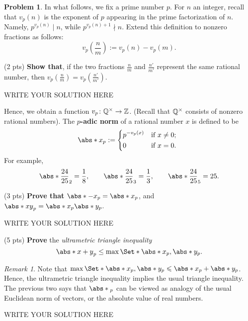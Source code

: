 \documentclass[11pt]{article}
\theoremstyle{plain}
\theoremstyle{definition}
\newtheorem{problem}{Problem}
\theoremstyle{remark}
\newtheorem*{remark}{Remark}
\numberwithin{equation}{problem}
\begin{document}
\begin{problem}
	In what follows, we fix a prime number $p$.
	For $n$ an integer, recall that $v_p(n)$ is the exponent of $p$ appearing in the prime factorization of $n$. Namely, $p^{v_p(n)}\mid n$, while $p^{v_p(n)+1}\nmid n$. Extend this definition to nonzero fractions as follows:
	\[
		v_p(\frac{n}{m}) := v_p(n) - v_p(m).
	\]
	\begin{listinprob}
		\item (2 pts) \textbf{Show that}, if the two fractions $\frac{n}{m}$ and $\frac{n'}{m'}$ represent the same rational number, then $v_p(\frac{n}{m})=v_p(\frac{n'}{m'})$.
	\end{listinprob}
\begin{solution} %
WRITE YOUR SOLUTION HERE
\end{solution}\clearpage %

	Hence, we obtain a function $v_p\colon\mathbb{Q}^{\times}\to\mathbb{Z}$. (Recall that $\mathbb{Q}^{\times}$ consists of nonzero rational numbers). The \textbf{$p$-adic norm} of a rational number $x$ is defined to be
	\[
		\abs*{x}_p:=
		\begin{dcases*}
			p^{-v_p(x)} & if $x\neq 0$;\\
			0 & if $x=0$.
		\end{dcases*}
	\]
	For example,
	\[
		\abs*{\frac{24}{25}}_{2} = \frac{1}{8},\qquad 
		\abs*{\frac{24}{25}}_{3} = \frac{1}{3},\qquad 
		\abs*{\frac{24}{25}}_{5} = 25.
	\]	
	\begin{listinprob}[resume]
		\item (3 pts) \textbf{Prove that} $\abs*{-x}_p = \abs*{x}_p$, and $\abs*{xy}_p = \abs*{x}_p\abs*{y}_p$.
\begin{solution} %
WRITE YOUR SOLUTION HERE
\end{solution}\clearpage %

		\item (5 pts) \textbf{Prove} the \emph{ultrametric triangle inequality}
		\[
			\abs*{x+y}_p \leq \max\Set*{\abs*{x}_p,\abs*{y}_p}.
		\]
	\end{listinprob}
	\begin{remark}
		Note that $\max\Set*{\abs*{x}_p,\abs*{y}_p}\le\abs*{x}_p+\abs*{y}_p$. Hence, the ultrametric triangle inequality implies the usual  triangle inequality. The previous two says that $\abs*{}_p$ can be viewed as analogy of the usual Euclidean norm of vectors, or the absolute value of real numbers.
	\end{remark}
\end{problem}
\begin{solution} %
WRITE YOUR SOLUTION HERE
\end{solution}\clearpage %
\end{document}
